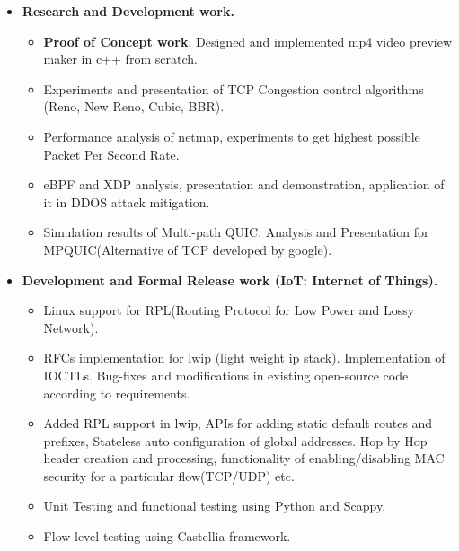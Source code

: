 \begin{itemize}
	\item \textbf{Research and Development work.}\\[-0.6cm]
	\begin{itemize}  	
		\item {\bf Proof of Concept work}: Designed and implemented mp4 video preview maker in c++ from scratch. \\[-0.5cm]
		\item Experiments and presentation of TCP Congestion control algorithms (Reno, New Reno, Cubic, BBR).\\[-0.5cm]
		\item Performance analysis of netmap, experiments to get highest possible Packet Per Second Rate.\\[-0.5cm]
		\item eBPF and XDP analysis, presentation and demonstration, application of it in DDOS attack mitigation.\\[-0.5cm] 
		\item Simulation results of Multi-path QUIC. Analysis and Presentation for MPQUIC(Alternative of TCP developed by google).\\[-0.5cm]
	\end{itemize}
	\item \textbf{Development and Formal Release work (IoT: Internet of Things).} \\[-0.6cm]
	\begin{itemize} 
	 \item Linux support for RPL(Routing Protocol for Low Power and Lossy Network).\\[-0.5cm]
	 \item RFCs implementation for lwip (light weight ip stack). Implementation of IOCTLs. Bug-fixes and modifications in existing open-source code according to requirements.\\[-0.5cm]
	 \item Added RPL support in lwip, APIs for adding static default routes and prefixes, Stateless auto configuration of global addresses. Hop by Hop header creation and processing, functionality of enabling/disabling MAC security for a particular flow(TCP/UDP) etc.\\[-0.5cm]
	 \item Unit Testing and functional testing using Python and Scappy.\\[-0.5cm]
	 \item Flow level testing using Castellia framework.\\[-0.5cm]

\end{itemize}
\end{itemize}
